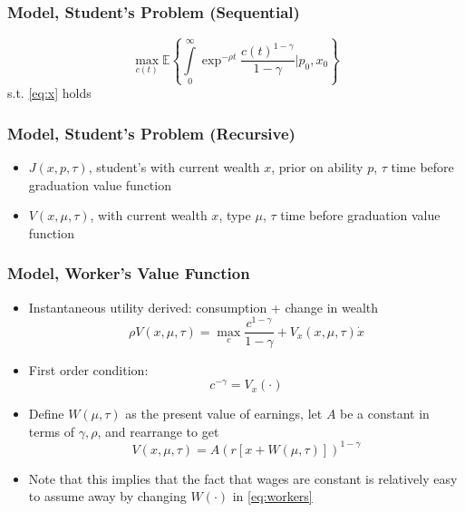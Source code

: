\begin{frame}
	\frametitle{Model, Student's Problem (Sequential)}
		\begin{equation}
			\max _{ c(t)}\mathbb{E} \left\{ \int \limits _{0} ^{\infty} \exp ^{- \rho t} \frac{c(t)^{1 - \gamma}}{1 - \gamma} | p_{0}, x_{0}  \right\}
		\end{equation}
\noindent s.t. \eqref{eq:x} holds
\end{frame}

\begin{frame}
	\frametitle{Model, Student's Problem (Recursive)}
		\begin{itemize}
			\item $J(x,p,\tau)$, student's with current wealth $x$, prior on ability $p$, $\tau$ time before graduation value function
			\item $V(x,\mu,\tau)$, with current wealth $x$, type $\mu$, $\tau$ time before graduation value function
		\end{itemize}
\end{frame}

\begin{frame}
	\frametitle{Model, Worker's Value Function}
		\begin{itemize}
			\item Instantaneous utility derived: consumption + change in wealth
				\begin{equation}
					\rho V(x,\mu,\tau) = \max_{c} \frac{c^{1 - \gamma}}{1 - \gamma} + V_{x}(x,\mu,\tau)\dot{x}
				\end{equation}
			\item First order condition:
				\begin{equation}
					c^{- \gamma} = V_{x}(\cdot)
				\end{equation}
			\item Define $W(\mu, \tau)$ as the present value of earnings, let $A$ be a constant in terms of $\gamma, \rho$, and rearrange to get
				\begin{equation}
					V(x,\mu,\tau) = A \left( r \left[ x + W(\mu,\tau) \right]  \right)^{1 - \gamma} \label{eq:workers}
				\end{equation}
			\item Note that this implies that the fact that wages are constant is relatively easy to assume away by changing $W(\cdot)$ in \ref{eq:workers}
		\end{itemize}
\end{frame}

